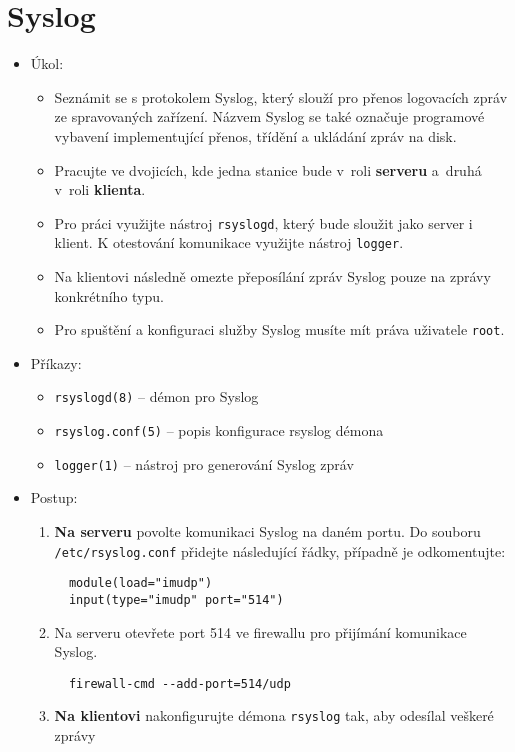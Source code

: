 \section{Syslog}
\begin{itemize}
  \item Úkol: 
    \begin{itemize}
      \item Seznámit se s protokolem Syslog, který slouží pro přenos
        logovacích zpráv ze spravovaných zařízení. Názvem Syslog se také označuje programové vybavení implementující přenos, třídění a ukládání zpráv na disk.
      \item Pracujte ve dvojicích, kde jedna stanice bude v~roli {\bf serveru} a~druhá v~roli {\bf klienta}.
      \item Pro práci využijte nástroj {\tt rsyslogd}, který bude sloužit jako server i klient.
        K otestování komunikace využijte nástroj {\tt logger}.
      \item Na klientovi následně omezte přeposílání zpráv Syslog pouze na zprávy konkrétního typu.
      \item Pro spuštění a konfiguraci služby Syslog musíte mít práva uživatele {\tt root}.
    \end{itemize}
  \item Příkazy:
    \begin{itemize}
      \item {\tt rsyslogd(8)} -- démon pro Syslog
      \item {\tt rsyslog.conf(5)} -- popis konfigurace rsyslog démona
      \item {\tt logger(1)} -- nástroj pro generování Syslog zpráv
    \end{itemize}
  \item Postup:
    \begin{enumerate}
      \item {\bf Na serveru} povolte komunikaci Syslog na daném portu. Do souboru {\tt /etc/rsyslog.conf} přidejte následující řádky, případně je odkomentujte:
\begin{verbatim}
  module(load="imudp")
  input(type="imudp" port="514")
\end{verbatim}
      \item Na serveru otevřete port 514 ve firewallu pro přijímání komunikace Syslog.
\begin{verbatim}
  firewall-cmd --add-port=514/udp
\end{verbatim}
      \item {\bf Na klientovi} nakonfigurujte démona {\tt rsyslog} tak, aby odesílal veškeré zprávy

\end{enumerate}
\end{itemize}
